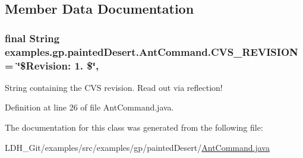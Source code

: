 \subsection{Member Data Documentation}
\hypertarget{classexamples_1_1gp_1_1painted_desert_1_1_ant_command_ab621514a6470804ae5f933f1c7c5ade5}{
\subsubsection[{C\-V\-S\-\_\-\-R\-E\-V\-I\-S\-I\-O\-N}]{\setlength{\rightskip}{0pt plus 5cm}final String examples.\-gp.\-painted\-Desert.\-Ant\-Command.\-C\-V\-S\-\_\-\-R\-E\-V\-I\-S\-I\-O\-N = \char`\"{}\$Revision\-: 1. \$\char`\"{}\hspace{0.3cm}{\ttfamily [static]}, {\ttfamily [private]}}}\label{classexamples_1_1gp_1_1painted_desert_1_1_ant_command_ab621514a6470804ae5f933f1c7c5ade5}
String containing the C\-V\-S revision. Read out via reflection! 

Definition at line 26 of file Ant\-Command.\-java.



The documentation for this class was generated from the following file\-:\begin{DoxyCompactItemize}
\item 
L\-D\-H\-\_\-\-Git/examples/src/examples/gp/painted\-Desert/\hyperlink{painted_desert_2_ant_command_8java}{Ant\-Command.\-java}\end{DoxyCompactItemize}
